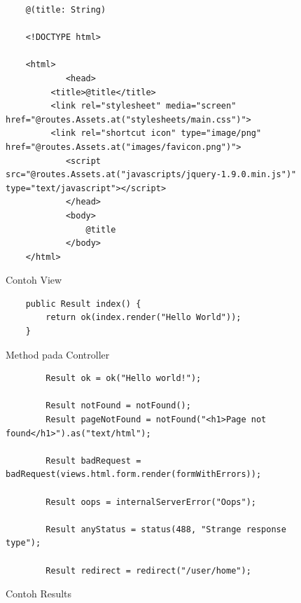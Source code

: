 \begin{figure}[H]
	\centering
	
	\begin{lstlisting}
	@(title: String)

	<!DOCTYPE html>

	<html>
    		<head>
       	 <title>@title</title>
       	 <link rel="stylesheet" media="screen" href="@routes.Assets.at("stylesheets/main.css")">
       	 <link rel="shortcut icon" type="image/png" href="@routes.Assets.at("images/favicon.png")">
        	<script src="@routes.Assets.at("javascripts/jquery-1.9.0.min.js")" type="text/javascript"></script>
    		</head>
    		<body>
        		@title
    		</body>
	</html>
	\end{lstlisting}
	\caption{Contoh View}
	\label{fig:2_play_view}
\end{figure}


\begin{figure}[H]
	\centering
	
	\begin{lstlisting}
	public Result index() {
        return ok(index.render("Hello World"));
    }
	\end{lstlisting}
	\caption{Method pada Controller}
	\label{fig:2_play_controller}
\end{figure}

\begin{figure}[H]
	\centering
	
	\begin{lstlisting}
		Result ok = ok("Hello world!");
		
		Result notFound = notFound();
		Result pageNotFound = notFound("<h1>Page not found</h1>").as("text/html");
		
		Result badRequest = badRequest(views.html.form.render(formWithErrors));
		
		Result oops = internalServerError("Oops");
		
		Result anyStatus = status(488, "Strange response type");
		
		Result redirect = redirect("/user/home");
	\end{lstlisting}
	\caption{Contoh Results}
	\label{fig:2_play_controller_method}
\end{figure}

